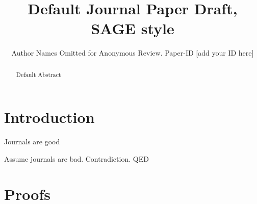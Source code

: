 \documentclass{util/sage}
\begin{document}
\title{Default Journal Paper Draft, SAGE style}

\author{Author Names Omitted for Anonymous Review. Paper-ID [add your ID here]}
\address{LAAS-CNRS, Toulouse, France}
\maketitle
\begin{abstract}
        Default Abstract
\end{abstract}
\section{Introduction}

\begin{theorem}
        Journals are good
\end{theorem}

\begin{proofatend}
        Assume journals are bad. Contradiction. QED
\end{proofatend}

\section*{Proofs}
\printproofs


\end{document}
